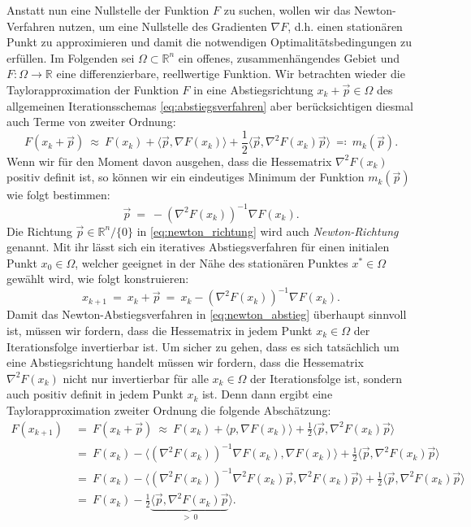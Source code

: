Anstatt nun eine Nullstelle der Funktion $F$ zu suchen, wollen wir das Newton-Verfahren nutzen, um eine Nullstelle des Gradienten $\nabla F$, d.h. einen stationären Punkt zu approximieren und damit die notwendigen Optimalitätsbedingungen zu erfüllen.
Im Folgenden sei $\Omega \subset \mathbb{R}^n$ ein offenes, zusammenhängendes Gebiet und $F \colon \Omega \rightarrow \mathbb{R}$ eine differenzierbare, reellwertige Funktion.
Wir betrachten wieder die Taylorapproximation der Funktion $F$ in eine Abstiegsrichtung $x_k + \vec{p} \in \Omega$ des allgemeinen Iterationsschemas \eqref{eq:abstiegsverfahren} aber berücksichtigen diesmal auch Terme von zweiter Ordnung:
\begin{equation}
\label{eq:modellfunktion}
F(x_k + \vec{p}) \ \approx \ F(x_k) + \langle \vec{p}, \nabla F(x_k) \rangle + \frac{1}{2} \langle \vec{p}, \nabla^2F(x_k)\vec{p} \rangle \ \eqqcolon \ m_k(\vec{p}).
\end{equation}
Wenn wir für den Moment davon ausgehen, dass die Hessematrix $\nabla^2 F(x_k)$ positiv definit ist, so können wir ein eindeutiges Minimum der Funktion $m_k(\vec{p})$ wie folgt bestimmen:
\begin{equation}
\label{eq:newton_richtung}
\vec{p} \ = \ -(\nabla^2 F(x_k))^{-1} \nabla F(x_k).
\end{equation}
Die Richtung $\vec{p} \in \mathbb{R}^n / \lbrace 0 \rbrace$ in \eqref{eq:newton_richtung} wird auch \emph{Newton-Richtung} genannt.
Mit ihr lässt sich ein iteratives Abstiegsverfahren für einen initialen Punkt $x_0 \in \Omega$, welcher geeignet in der Nähe des stationären Punktes $x^* \in \Omega$ gewählt wird, wie folgt konstruieren:
\begin{equation}
\label{eq:newton_abstieg}
x_{k+1} \ = \ x_k + \vec{p} \ = \ x_k - (\nabla^2 F(x_k))^{-1} \nabla F(x_k).
\end{equation}
Damit das Newton-Abstiegsverfahren in \eqref{eq:newton_abstieg} überhaupt sinnvoll ist, müssen wir fordern, dass die Hessematrix in jedem Punkt $x_k \in \Omega$ der Iterationsfolge invertierbar ist.
Um sicher zu gehen, dass es sich tatsächlich um eine Abstiegsrichtung handelt müssen wir fordern, dass die Hessematrix $\nabla^2 F(x_k)$ nicht nur invertierbar für alle $x_k \in \Omega$ der Iterationsfolge ist, sondern auch positiv definit in jedem Punkt $x_k$ ist. Denn dann ergibt eine Taylorapproximation zweiter Ordnung die folgende Abschätzung:
\begin{equation*}
\begin{split}
F(x_{k+1}) \ &= \ F(x_k + \vec{p}) \ \approx \ F(x_k) + \langle p, \nabla F(x_k) \rangle + \frac{1}{2} \langle \vec{p}, \nabla^2F(x_k) \vec{p} \rangle \\
\ &= \ F(x_k) - \langle (\nabla^2 F(x_k))^{-1} \nabla F(x_k), \nabla F(x_k) \rangle + \frac{1}{2} \langle \vec{p}, \nabla^2F(x_k) \vec{p} \rangle\\
\ &= \ F(x_k) - \langle (\nabla^2 F(x_k))^{-1} \nabla^2 F(x_k) \vec{p}, \nabla^2 F(x_k) \vec{p} \rangle + \frac{1}{2} \langle \vec{p}, \nabla^2F(x_k) \vec{p} \rangle \\
\ &= \ F(x_k) - \frac{1}{2} \underbrace{\langle \vec{p}, \nabla^2 F(x_k) \vec{p}}_{>~0} \rangle.
\end{split}
\end{equation*}
